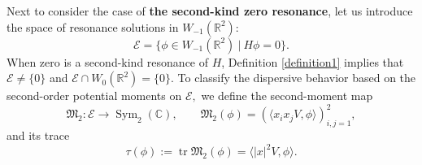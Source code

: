 \documentclass[reqno]{amsart}
\numberwithin{equation}{section}
\begin{document}
Next to consider the case of \textbf{the second-kind zero resonance},   let us introduce the space of resonance solutions in $W_{-1}(\mathbb{R}^2)$:  
\[
\mathcal{E} = \big\{ \phi \in W_{-1}(\mathbb{R}^2) \ \big| \ H\phi = 0 \big\}. 
\] 
When zero is a second-kind resonance of $H$, Definition \ref{definition1} implies that $\mathcal{E} \neq \{0\}$ and  $\mathcal{E} \cap W_0(\mathbb{R}^2) = \{0\}$.     
To classify the dispersive behavior based on the second-order potential moments on $\mathcal{E},$
we define the
second-moment map
\begin{equation}\label{eq:second-moment-map}
	\mathfrak{M}_2:
	\mathcal{E}
	\longrightarrow
	\operatorname{Sym}_2(\mathbb{C}),
	\qquad
	\mathfrak{M}_2(\phi)
	=
	\left(
	\langle x_ix_jV,\phi\rangle
	\right)_{i,j=1}^2,
\end{equation}
and its trace
\begin{equation}\label{eq:radial-second-moment}
	\tau(\phi)
	:=
	\operatorname{tr}\mathfrak{M}_2(\phi)
	=
	\langle |x|^2V,\phi\rangle.
\end{equation}
\end{document}
